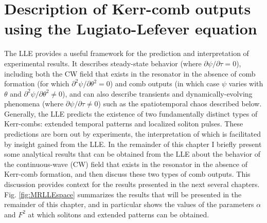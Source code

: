 \section{Description of Kerr-comb outputs using the Lugiato-Lefever equation}

The LLE provides a useful framework for the prediction and interpretation of experimental results. It describes steady-state behavior (where $\partial\psi/\partial\tau=0$), including both the CW field that exists in the resonator in the absence of comb formation (for which $\partial^2\psi/\partial\theta^2=0$) and comb outputs (in which case $\psi$ varies with $\theta$ and $\partial^2\psi/\partial\theta^2\neq0$), and can also describe transients and dynamically-evolving phenomena (where $\partial\psi/\partial\tau\neq0$) such as the spatiotemporal chaos described below. Generally, the LLE predicts the existence of two fundamentally distinct types of Kerr-combs: extended temporal patterns and localized soliton pulses. These predictions are born out by experiments, the interpretation of which is facilitated by insight gained from the LLE. In the remainder of this chapter I briefly present some analytical results that can be obtained from the LLE about the behavior of the continuous-wave (CW) field that exists in the resonator in the absence of Kerr-comb formation, and then discuss these two types of comb outputs. This discussion provides context for the results presented in the next several chapters. Fig. \ref{fig:MRLLEspace} summarizes the results that will be presented in the remainder of this chapter, and in particular shows the values of the parameters $\alpha$ and $F^2$ at which solitons and extended patterns can be obtained.




